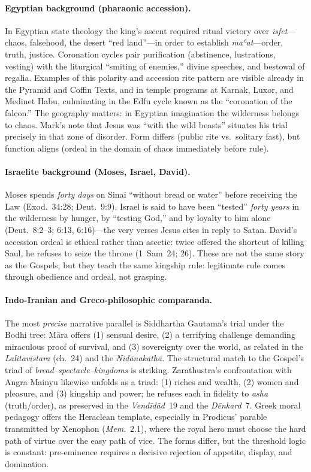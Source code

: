 \paragraph*{Egyptian background (pharaonic accession).}
In Egyptian state theology the king’s ascent required ritual victory over \emph{isfet}---chaos, falsehood, the desert “red land”---in order to establish \emph{maʿat}---order, truth, justice.
Coronation cycles pair purification (abstinence, lustrations, vesting) with the liturgical “smiting of enemies,” divine speeches, and bestowal of regalia.
Examples of this polarity and accession rite pattern are visible already in the Pyramid and Coffin Texts, and in temple programs at Karnak, Luxor, and Medinet Habu, culminating in the Edfu cycle known as the “coronation of the falcon.”
The geography matters: in Egyptian imagination the wilderness belongs to chaos.
Mark’s note that Jesus was “with the wild beasts” situates his trial precisely in that zone of disorder.
Form differs (public rite vs.\ solitary fast), but function aligns (ordeal in the domain of chaos immediately before rule).

\paragraph*{Israelite background (Moses, Israel, David).}
Moses spends \emph{forty days} on Sinai “without bread or water” before receiving the Law (Exod.~34:28; Deut.~9:9).
Israel is said to have been “tested” \emph{forty years} in the wilderness by hunger, by “testing God,” and by loyalty to him alone (Deut.~8:2--3; 6:13, 6:16)---the very verses Jesus cites in reply to Satan.
David’s accession ordeal is ethical rather than ascetic: twice offered the shortcut of killing Saul, he refuses to seize the throne (1~Sam~24; 26).
These are not the same story as the Gospels, but they teach the same kingship rule: legitimate rule comes through obedience and ordeal, not grasping.

\paragraph*{Indo-Iranian and Greco-philosophic comparanda.}
The most \emph{precise} narrative parallel is Siddhartha Gautama’s trial under the Bodhi tree: Māra offers (1) sensual desire, (2) a terrifying challenge demanding miraculous proof of survival, and (3) sovereignty over the world, as related in the \emph{Lalitavistara} (ch.~24) and the \emph{Nidānakathā}.
The structural match to the Gospel’s triad of \emph{bread–spectacle–kingdoms} is striking.
Zarathustra’s confrontation with Angra Mainyu likewise unfolds as a triad: (1) riches and wealth, (2) women and pleasure, and (3) kingship and power; he refuses each in fidelity to \emph{asha} (truth/order), as preserved in the \emph{Vendīdād}~19 and the \emph{Dēnkard}~7.
Greek moral pedagogy offers the Heraclean template, especially in Prodicus’ parable transmitted by Xenophon (\emph{Mem}.~2.1), where the royal hero must choose the hard path of virtue over the easy path of vice.
The forms differ, but the threshold logic is constant: pre-eminence requires a decisive rejection of appetite, display, and domination.


